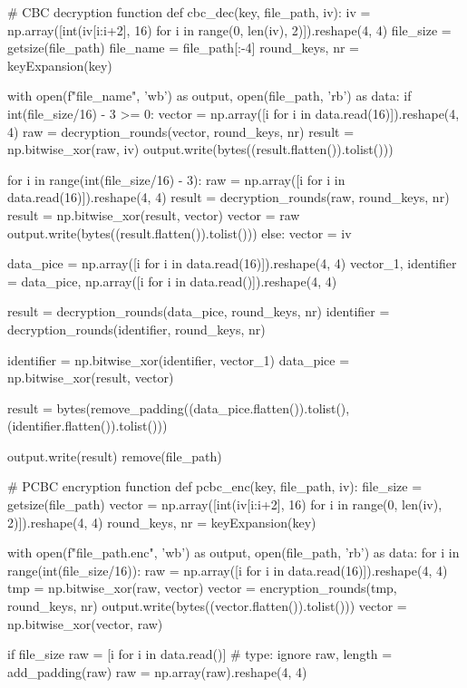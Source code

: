 \begin{python}
# CBC decryption function
def cbc_dec(key, file_path, iv):
    iv = np.array([int(iv[i:i+2], 16) for i in range(0, len(iv), 2)]).reshape(4, 4)
    file_size = getsize(file_path)
    file_name = file_path[:-4]
    round_keys, nr = keyExpansion(key)

    with open(f"{file_name}", 'wb') as output, open(file_path, 'rb') as data:
        if int(file_size/16) - 3 >= 0:
            vector = np.array([i for i in data.read(16)]).reshape(4, 4)
            raw = decryption_rounds(vector, round_keys, nr)
            result = np.bitwise_xor(raw, iv)
            output.write(bytes((result.flatten()).tolist()))

            for i in range(int(file_size/16) - 3):
                raw = np.array([i for i in data.read(16)]).reshape(4, 4)
                result = decryption_rounds(raw, round_keys, nr)
                result = np.bitwise_xor(result, vector)
                vector = raw
                output.write(bytes((result.flatten()).tolist()))
        else:
            vector = iv

        data_pice = np.array([i for i in data.read(16)]).reshape(4, 4)
        vector_1, identifier = data_pice, np.array([i for i in data.read()]).reshape(4, 4)

        result = decryption_rounds(data_pice, round_keys, nr)
        identifier = decryption_rounds(identifier, round_keys, nr)

        identifier = np.bitwise_xor(identifier, vector_1)
        data_pice = np.bitwise_xor(result, vector)

        result = bytes(remove_padding((data_pice.flatten()).tolist(), (identifier.flatten()).tolist()))

        output.write(result)
    remove(file_path)


# PCBC encryption function
def pcbc_enc(key, file_path, iv):
    file_size = getsize(file_path)
    vector = np.array([int(iv[i:i+2], 16) for i in range(0, len(iv), 2)]).reshape(4, 4)
    round_keys, nr = keyExpansion(key)

    with open(f"{file_path}.enc", 'wb') as output, open(file_path, 'rb') as data:
        for i in range(int(file_size/16)):
            raw = np.array([i for i in data.read(16)]).reshape(4, 4)
            tmp = np.bitwise_xor(raw, vector)
            vector = encryption_rounds(tmp, round_keys, nr)
            output.write(bytes((vector.flatten()).tolist()))
            vector = np.bitwise_xor(vector, raw)

        if file_size %
            raw = [i for i in data.read()]  # type: ignore
            raw, length = add_padding(raw)
            raw = np.array(raw).reshape(4, 4)


\end{python}
